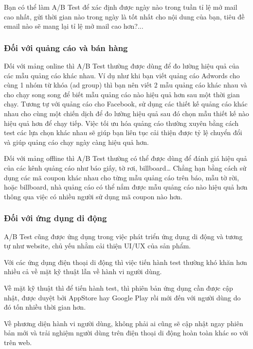 Bạn có thể làm A/B Test để xác định được ngày nào trong tuần tỉ lệ mở mail cao nhất, gửi thời gian nào trong ngày là tốt nhất cho nội dung của bạn, tiêu đề email nào sẽ mang lại tỉ lệ mở mail cao hơn?...

\subsubsection{Đối với quảng cáo và bán hàng}

Đối với mảng online thì A/B Test thường được dùng để đo lường hiệu quả của các mẫu quảng cáo khác nhau. Ví dụ như khi bạn viết quảng cáo Adwords cho cùng 1 nhóm từ khóa (ad group) thì bạn nên viết 2 mẫu quảng cáo khác nhau và cho chạy song song để biết mẫu quảng cáo nào hiệu quả hơn sau một thời gian chạy. Tương tự với quảng cáo cho Facebook, sử dụng các thiết kế quảng cáo khác nhau cho cùng một chiến dịch để đo lường hiệu quả sau đó chọn mẫu thiết kế nào hiệu quả hơn để chạy tiếp. Việc tối ưu hóa quảng cáo thường xuyên bằng cách test các lựa chọn khác nhau sẽ giúp bạn liên tục cải thiện được tỷ lệ chuyển đổi và giúp quảng cáo chạy ngày càng hiệu quả hơn.

Đối với mảng offline thì A/B Test thường có thể được dùng để đánh giá hiệu quả của các kênh quảng cáo như báo giấy, tờ rơi, billboard… Chẳng hạn bằng cách sử dụng các mã coupon khác nhau cho từng mẫu quảng cáo trên báo, mẫu tờ rời, hoặc billboard, nhà quảng cáo có thể nắm được mẫu quảng cáo nào hiệu quả hơn thông qua việc có nhiều người sử dụng mã coupon nào hơn.

\subsubsection{Đối với ứng dụng di động}

A/B Test cũng được ứng dụng trong việc phát triển ứng dụng di động và tương tự như website, chủ yếu nhằm cải thiện UI/UX của sản phẩm.

Với các ứng dụng điện thoại di động thì việc tiến hành test thường khó khăn hơn nhiều cả về mặt kỹ thuật lẫn về hành vi người dùng.

Về mặt kỹ thuật thì để tiến hành test, thì phiên bản ứng dụng cần được cập nhật, được duyệt bởi AppStore hay Google Play rồi mới đến với người dùng do đó tốn nhiều thời gian hơn.

Về phương diện hành vi người dùng, không phải ai cũng sẽ cập nhật ngay phiên bản mới và trải nghiệm người dùng trên điện thoại di động hoàn toàn khác so với trên web.

